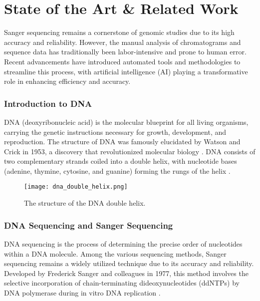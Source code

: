 
%

\chapter{State of the Art \& Related Work}
\label{cha:users_manual}

\glsresetall

Sanger sequencing remains a cornerstone of genomic studies due to its high accuracy and reliability. However, the manual analysis of chromatograms and sequence data has traditionally been labor-intensive and prone to human error. Recent advancements have introduced automated tools and methodologies to streamline this process, with artificial intelligence (AI) playing a transformative role in enhancing efficiency and accuracy.

\subsection{Introduction to DNA}
DNA (deoxyribonucleic acid) is the molecular blueprint for all living organisms, carrying the genetic instructions necessary for growth, development, and reproduction. The structure of DNA was famously elucidated by Watson and Crick in 1953, a discovery that revolutionized molecular biology \cite{watson_crick_dna}. DNA consists of two complementary strands coiled into a double helix, with nucleotide bases (adenine, thymine, cytosine, and guanine) forming the rungs of the helix \cite{khan_dna_structure}.

\begin{figure}[H]
\centering
\texttt{[image: dna\_double\_helix.png]}
\caption{The structure of the DNA double helix.}
\label{fig:dna_double_helix}
\end{figure}

\subsection{DNA Sequencing and Sanger Sequencing}
DNA sequencing is the process of determining the precise order of nucleotides within a DNA molecule. Among the various sequencing methods, Sanger sequencing remains a widely utilized technique due to its accuracy and reliability. Developed by Frederick Sanger and colleagues in 1977, this method involves the selective incorporation of chain-terminating dideoxynucleotides (ddNTPs) by DNA polymerase during in vitro DNA replication \cite{sanger_method_original}.

